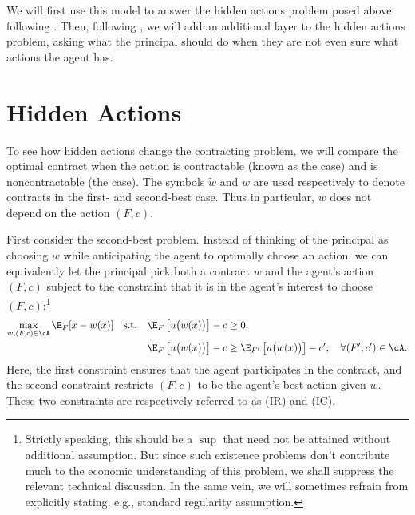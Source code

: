 We will first use this model to answer the hidden actions problem posed above following \textcite{holmstrom1979MoralHazard}.
Then, following \textcite{carroll2015RobustnessLinear}, we will add an additional layer to the hidden actions problem, asking what the principal should do when they are not even sure what actions the agent has.

\section{Hidden Actions}
To see how hidden actions change the contracting problem, we will compare the optimal contract when the action is contractable (known as the  case) and is noncontractable (the  case).
The symbols \(\tilde{w}\) and \(w\) are used respectively to denote contracts in the first- and second-best case.
Thus in particular, \(w\) does not depend on the action \((F, c)\).

First consider the second-best problem.
Instead of thinking of the principal as choosing \(w\) while anticipating the agent to optimally choose an action, we can equivalently let the principal pick both a contract \(w\) and the agent's action \((F, c)\) subject to the constraint that it is in the agent's interest to choose \((F, c)\):\footnote{Strictly speaking, this should be a \(\sup\) that need not be attained without additional assumption. But since such existence problems don't contribute much to the economic understanding of this problem, we shall suppress the relevant technical discussion. In the same vein, we will sometimes refrain from explicitly stating, e.g., standard regularity assumption.}
\begin{align*}
  \max_{w, (F, c) \in \cA} \E_F[x - w(x)]
  \quad\text{s.t.}\quad &\E_F\left[u\big(w(x)\big)\right] - c \geq 0, \\
  &\E_F\left[u\big(w(x)\big)\right] - c \geq \E_{F'}\left[u\big(w(x)\big)\right] - c', \quad \forall (F', c') \in \cA.
\end{align*}
Here, the first constraint ensures that the agent participates in the contract, and the second constraint restricts \((F, c)\) to be the agent's best action given \(w\).
These two constraints are respectively referred to as  (IR) and  (IC).

